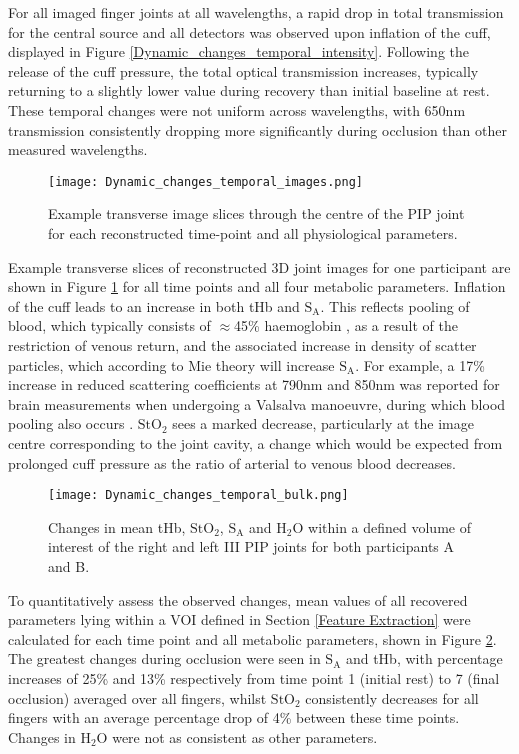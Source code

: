 \documentclass[twoside]{bhamthesis}
\theoremstyle{definition}
\begin{document}
For all imaged finger joints at all wavelengths, a rapid drop in total transmission for the central source and all detectors was observed upon inflation of the cuff, displayed in Figure \ref{Dynamic_changes_temporal_intensity}. Following the release of the cuff pressure, the total optical transmission increases, typically returning to a slightly lower value during recovery than initial baseline at rest. These temporal changes 
were not uniform across wavelengths, with 650nm transmission consistently dropping more significantly during occlusion than other measured wavelengths.

\begin{figure}[!ht]
\centering\texttt{[image: Dynamic\_changes\_temporal\_images.png]}
\caption{Example transverse image slices through the centre of the PIP joint for each reconstructed time-point and all physiological parameters.}
\label{Dynamic_changes_temporal_images}
\end{figure}

Example transverse slices of reconstructed 3D joint images for one participant are shown in Figure \ref{Dynamic_changes_temporal_images} for all time points and all four metabolic parameters. Inflation of the cuff leads to an increase in both tHb and $\mathrm{S_A}$. This reflects pooling of blood, which typically consists of $\approx$45\% haemoglobin \cite{brun2000paradox}, as a result of the restriction of venous return, and the associated increase in density of scatter particles, which according to Mie theory will increase $\mathrm{S_A}$. For example, a 17\% increase in reduced scattering coefficients at 790nm and 850nm was reported for brain measurements when undergoing a Valsalva manoeuvre, during which blood pooling also occurs \cite{gao2011effects}. $\mathrm{StO_2}$ sees a marked decrease, particularly at the image centre corresponding to the joint cavity, a change which would be expected from prolonged cuff pressure as the ratio of arterial to venous blood decreases.

\begin{figure}[!ht]
\centering\texttt{[image: Dynamic\_changes\_temporal\_bulk.png]}
\caption{Changes in mean tHb, $\mathrm{StO_2}$, $\mathrm{S_A}$ and
$\mathrm{H_2O}$ within a defined volume of interest of the right and left III PIP joints for both participants A and B.}
\label{Dynamic_changes_temporal_bulk}
\end{figure}

To quantitatively assess the observed changes, mean values of all recovered parameters lying within a VOI defined in Section \ref{Feature Extraction} were calculated for each time point and all metabolic parameters, shown in Figure \ref{Dynamic_changes_temporal_bulk}. The greatest changes during occlusion were seen in $\mathrm{S_A}$ and tHb, with percentage increases of 25\% and 13\% respectively from time point 1 (initial rest) to 7 (final occlusion) averaged over all fingers, whilst $\mathrm{StO_2}$ consistently decreases for all fingers with an average percentage drop of 4\% between these time points. Changes in $\mathrm{H_2O}$ were not as consistent as other parameters.
\end{document}
